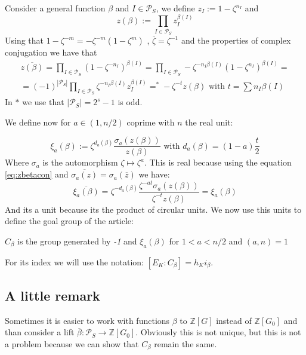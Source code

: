 \documentclass[]{article}
\theoremstyle{plain}
\theoremstyle{remark}
\theoremstyle{definition}
\newcommand{\PS}{\mathcal{P}_S}
\newcommand{\Z}{\mathbb{Z}}
\DeclareMathOperator*{\eqb }{=}
\begin{document}
	Consider a general function $\beta$ and $ I \in \PS $, we define $ z_I  := 1 - \zeta ^{n_I}$ and 
	$$ z(\beta ):= \prod_{I \in \PS } z_I ^{\beta(I)} $$ 
	Using that $ 1 - \zeta ^{-m} = -\zeta^{-m} ( 1 - \zeta ^m ) $ , $ \overline{ \zeta} = \zeta ^{-1}  $ and the properties of complex conjugation we have that 
	\begin{multline}\label{eq:zbetacon}
		\overline{z(\beta )} = \prod_{I \in \PS} ({1 - \zeta ^{-n_I}})^{\beta(I)}  = \prod_{I \in \PS} - \zeta ^{-n_I \beta(I)} (1 - \zeta ^{n_I})^{\beta (I)} =\\
		=(-1)^{|\PS|}\prod_{I \in \PS} \zeta ^{-n_I \beta(I)} z_I^{\beta (I)} \eqb^\ast - \zeta^{-t} z(\beta) \text{ with } t = \sum n_I \beta(I)
	\end{multline}
	In $\ast$ we use that $ |\PS| = 2^s -1 $ is odd. 
	
	We define now for $ a \in (1 , n/2)$ coprime with $ n $ the real unit:

	\begin{equation}\label{eq:xi}
		\xi_a (\beta) := \zeta ^{d_a (\beta)} \frac{\sigma_a (z(\beta))}{z(\beta)} \text{ with } d_a(\beta)= (1-a)\frac{t}{2}
	\end{equation}
	Where $\sigma_a$ is the automorphism $ \zeta \mapsto \zeta ^a $. This is real because using the equation \ref{eq:zbetacon} and $ \overline{\sigma_a(z)}= \sigma_a(\overline{z}) $ we have:
	\begin{equation}
		\overline{\xi_a(\beta)} = \zeta ^{-d_a(\beta)} \frac{\zeta^{-at} \sigma_a (z(\beta))}{\zeta^{-t} z(\beta)} = \xi_a(\beta)
	\end{equation}
 	And its a unit because its the product of circular units. %
 	We now use this units to define the goal group of the article:
 	\begin{tcolorbox}
 		$C_\beta $ is the group generated by \textit{-1} and $ \xi_a (\beta) $ for $ 1< a< n/2 $ and $ (a,n)=1 $
 	\end{tcolorbox}
 	For its index we will use the notation: $ [E_K : C_\beta] = h_K i_\beta $. 

	\subsection{A little remark}
	
	Sometimes it is easier to work with functions $\beta$ to $ \Z [G] $ instead of $ \Z [G_0] $ and than consider a lift $ \overline{\beta} : \PS \to \Z [G_0] $. Obviously this is not unique, but this is not a problem because we can show that $ C_\beta $ remain the same. 
	
\end{document}
